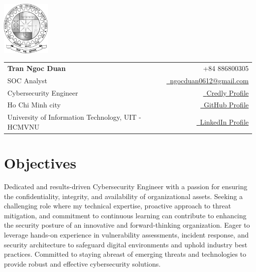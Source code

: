 \documentclass[a4paper,11pt]{article}
\makeatletter
\newcommand{\name}{Tran Ngoc Duan} %
\newcommand{\roll}{SOC Analyst} %
\newcommand{\phone}{886800305} %
\newcommand{\emaila}{ngocduan0612@gmail.com} %
\makeatother
\begin{document}
\selectfont


\parbox{2.35cm}{%
\includegraphics[width=2.35cm,clip]{NITRR_logo_bw.png}
}
\parbox{\dimexpr\linewidth-2.8cm\relax}{
\begin{tabularx}{\linewidth}{L r} \\
  \textbf{\Large \name} & {\raisebox{0.0\height}{\footnotesize \faPhone}\ +84 \phone}\\
  {\roll} & \href{mailto:\emaila}{\raisebox{0.0\height}{\footnotesize \faEnvelope}\ {\emaila}} \\
  {Cybersecurity Engineer} &  \href{https://www.credly.com/users/tran-duan}{\raisebox{0.0\height}{\footnotesize \faEnvelope}\ {Credly Profile}}\\
  {Ho Chi Minh city } &  \href{https://github.com/luckystars0612}{\raisebox{0.0\height}{\footnotesize \faGithub}\ {GitHub Profile}} \\
  {University of Information Technology, UIT - HCMVNU} & \href{https://www.linkedin.com/in/ngoc-duan-tran-bb2231250/}{\raisebox{0.0\height}{\footnotesize \faLinkedin}\ {LinkedIn Profile}}
\end{tabularx}
}



\section{\textbf{Objectives}}
  Dedicated and results-driven Cybersecurity Engineer with a passion for ensuring the confidentiality, integrity, and availability of organizational assets. Seeking a challenging role where my technical expertise, proactive approach to threat mitigation, and commitment to continuous learning can contribute to enhancing the security posture of an innovative and forward-thinking organization. Eager to leverage hands-on experience in vulnerability assessments, incident response, and security architecture to safeguard digital environments and uphold industry best practices. Committed to staying abreast of emerging threats and technologies to provide robust and effective cybersecurity solutions.
\vspace{-5.5mm}
%
\vspace{10pt}
\end{document}
